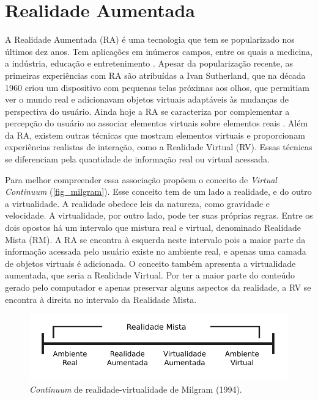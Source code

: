 \section{Realidade Aumentada}
\label{sec_realidade_aumentada}
A Realidade Aumentada (RA) é uma tecnologia que tem se popularizado nos últimos dez anos. Tem aplicações em inúmeros campos, entre os quais a medicina, a indústria, educação e entretenimento \cite{mekni_augmented_2014}. Apesar da popularização recente, as primeiras experiências com RA são atribuídas a Ivan Sutherland, que na década 1960 criou um dispositivo com pequenas telas próximas aos olhos, que permitiam ver o mundo real e adicionavam objetos virtuais adaptáveis às mudanças de perspectiva do usuário. Ainda hoje a RA se caracteriza por complementar a percepção do usuário ao associar elementos virtuais sobre elementos reais  \cite{parveau_3ivclass_2018}. Além da RA, existem outras técnicas que mostram elementos virtuais e proporcionam experiências realistas de interação, como a Realidade Virtual (RV). Essas técnicas se diferenciam pela quantidade de informação real ou virtual acessada.

Para melhor compreender essa associação  propõem o conceito de \textit{Virtual Continuum} (\autoref{fig_milgram}). Esse conceito tem de um lado a realidade, e do outro a virtualidade. A realidade obedece leis da natureza, como gravidade e velocidade. A virtualidade, por outro lado, pode ter suas próprias regras. Entre os dois opostos há um intervalo que mistura real e virtual, denominado Realidade Mista (RM). A RA se encontra à esquerda neste intervalo pois a maior parte da informação acessada pelo usuário existe no ambiente real, e apenas uma camada de objetos virtuais é adicionada. O conceito também apresenta a virtualidade aumentada, que seria a Realidade Virtual. Por ter a maior parte do conteúdo gerado pelo computador e apenas preservar alguns aspectos da realidade, a RV se encontra à direita no intervalo da Realidade Mista.

\begin{figure}[!htpb]
  \centering
  \includegraphics[width=.6\linewidth,fbox]{figs/milgram.png}
  \caption{\textit{Continuum} de realidade-virtualidade de Milgram (1994).}
  \label{fig_milgram}
\end{figure}

